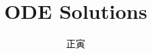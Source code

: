 \usepackage{graphicx}
\usepackage{wrapfig}
\usepackage{fancyhdr}
\usepackage{bm}
\usepackage{siunitx}

\newcommand\bmitPhi{\bm{\varPhi}}
\newcommand\bmitPsi{\bm{\varPsi}}
\newcommand\rmJ{\mathrm{J}}
\renewcommand{\contentsname}{目录}

\newtheorem{conclusion}{结论}


\let\leq=\leqslant
\let\geq=\geqslant



\title{ODE Solutions}
\author{正寅}